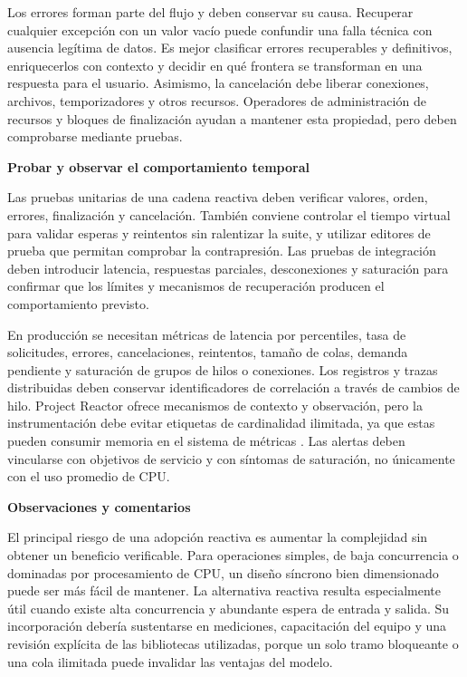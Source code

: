 \documentclass[12pt,letterpaper]{article}
\newcommand{\seccion}[1]{%
  \vspace{4pt}%
  {\noindent\textbf{#1}\par}%
  \vspace{1pt}%
}
\begin{document}
Los errores forman parte del flujo y deben conservar su causa. Recuperar cualquier excepción con un valor vacío puede confundir una falla técnica con ausencia legítima de datos. Es mejor clasificar errores recuperables y definitivos, enriquecerlos con contexto y decidir en qué frontera se transforman en una respuesta para el usuario. Asimismo, la cancelación debe liberar conexiones, archivos, temporizadores y otros recursos. Operadores de administración de recursos y bloques de finalización ayudan a mantener esta propiedad, pero deben comprobarse mediante pruebas.

\textbf{Probar y observar el comportamiento temporal}\par
Las pruebas unitarias de una cadena reactiva deben verificar valores, orden, errores, finalización y cancelación. También conviene controlar el tiempo virtual para validar esperas y reintentos sin ralentizar la suite, y utilizar editores de prueba que permitan comprobar la contrapresión. Las pruebas de integración deben introducir latencia, respuestas parciales, desconexiones y saturación para confirmar que los límites y mecanismos de recuperación producen el comportamiento previsto.

En producción se necesitan métricas de latencia por percentiles, tasa de solicitudes, errores, cancelaciones, reintentos, tamaño de colas, demanda pendiente y saturación de grupos de hilos o conexiones. Los registros y trazas distribuidas deben conservar identificadores de correlación a través de cambios de hilo. Project Reactor ofrece mecanismos de contexto y observación, pero la instrumentación debe evitar etiquetas de cardinalidad ilimitada, ya que estas pueden consumir memoria en el sistema de métricas \parencite{reactorreference}. Las alertas deben vincularse con objetivos de servicio y con síntomas de saturación, no únicamente con el uso promedio de CPU.

\seccion{Observaciones y comentarios}
El principal riesgo de una adopción reactiva es aumentar la complejidad sin obtener un beneficio verificable. Para operaciones simples, de baja concurrencia o dominadas por procesamiento de CPU, un diseño síncrono bien dimensionado puede ser más fácil de mantener. La alternativa reactiva resulta especialmente útil cuando existe alta concurrencia y abundante espera de entrada y salida. Su incorporación debería sustentarse en mediciones, capacitación del equipo y una revisión explícita de las bibliotecas utilizadas, porque un solo tramo bloqueante o una cola ilimitada puede invalidar las ventajas del modelo.
\end{document}
